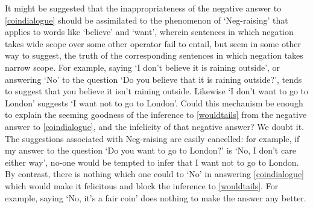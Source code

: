 \documentclass[leqno, 11pt, a5paper, openany]{article}
\begin{document}
It might be suggested that the inappropriateness of the negative answer to \ref{coindialogue} should be assimilated to the phenomenon of ‘Neg-raising’ that applies to words like ‘believe’ and ‘want’, wherein sentences in which negation takes wide scope over some other operator fail to entail, but seem in some other way to suggest, the truth of the corresponding sentences in which negation takes narrow scope. For example, saying `I don't believe it is raining outside', or answering ‘No’ to the question ‘Do you believe that it is raining outside?’, tends to suggest that you believe it isn't raining outside. Likewise `I don't want to go to London' suggests ‘I want not to go to London’. Could this mechanism be enough to explain the seeming goodness of the inference to \ref{wouldtails} from the negative answer to \ref{coindialogue}, and the infelicity of that negative answer? We doubt it. The suggestions associated with Neg-raising are easily cancelled: for example, if my answer to the question ‘Do you want to go to London?’ is `No, I don't care either way', no-one would be tempted to infer that I want not to go to London. By contrast, there is nothing which one could to ‘No’ in answering \ref{coindialogue} which would make it felicitous and block the inference to \ref{wouldtails}. For example, saying `No, it's a fair coin' does nothing to make the answer any better.
\end{document}
